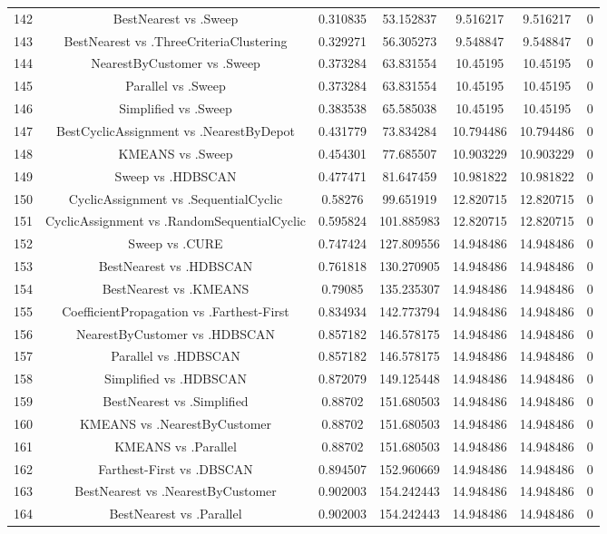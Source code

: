 \documentclass[a4paper,10pt]{article}
\begin{document}
\begin{landscape}
\begin{table}[!htp]
\begin{tabular}{ccccccc}
142&BestNearest vs .Sweep&0.310835&53.152837&9.516217&9.516217&0\\
143&BestNearest vs .ThreeCriteriaClustering&0.329271&56.305273&9.548847&9.548847&0\\
144&NearestByCustomer vs .Sweep&0.373284&63.831554&10.45195&10.45195&0\\
145&Parallel vs .Sweep&0.373284&63.831554&10.45195&10.45195&0\\
146&Simplified vs .Sweep&0.383538&65.585038&10.45195&10.45195&0\\
147&BestCyclicAssignment vs .NearestByDepot&0.431779&73.834284&10.794486&10.794486&0\\
148&KMEANS vs .Sweep&0.454301&77.685507&10.903229&10.903229&0\\
149&Sweep vs .HDBSCAN&0.477471&81.647459&10.981822&10.981822&0\\
150&CyclicAssignment vs .SequentialCyclic&0.58276&99.651919&12.820715&12.820715&0\\
151&CyclicAssignment vs .RandomSequentialCyclic&0.595824&101.885983&12.820715&12.820715&0\\
152&Sweep vs .CURE&0.747424&127.809556&14.948486&14.948486&0\\
153&BestNearest vs .HDBSCAN&0.761818&130.270905&14.948486&14.948486&0\\
154&BestNearest vs .KMEANS&0.79085&135.235307&14.948486&14.948486&0\\
155&CoefficientPropagation vs .Farthest-First&0.834934&142.773794&14.948486&14.948486&0\\
156&NearestByCustomer vs .HDBSCAN&0.857182&146.578175&14.948486&14.948486&0\\
157&Parallel vs .HDBSCAN&0.857182&146.578175&14.948486&14.948486&0\\
158&Simplified vs .HDBSCAN&0.872079&149.125448&14.948486&14.948486&0\\
159&BestNearest vs .Simplified&0.88702&151.680503&14.948486&14.948486&0\\
160&KMEANS vs .NearestByCustomer&0.88702&151.680503&14.948486&14.948486&0\\
161&KMEANS vs .Parallel&0.88702&151.680503&14.948486&14.948486&0\\
162&Farthest-First vs .DBSCAN&0.894507&152.960669&14.948486&14.948486&0\\
163&BestNearest vs .NearestByCustomer&0.902003&154.242443&14.948486&14.948486&0\\
164&BestNearest vs .Parallel&0.902003&154.242443&14.948486&14.948486&0\\

\end{tabular}
\end{table}
\end{landscape}
\end{document}
